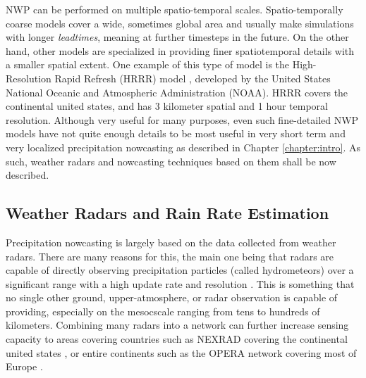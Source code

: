NWP can be performed on multiple spatio-temporal scales. Spatio-temporally coarse models cover a wide, sometimes global area and usually make simulations with longer \textit{leadtimes}, meaning at further timesteps in the future. On the other hand, other models are specialized in providing finer spatiotemporal details with a smaller spatial extent. One example of this type of model is the High-Resolution Rapid Refresh (HRRR) model \cite{alexander2020rapid}, developed by the United States National Oceanic and Atmospheric Administration (NOAA). HRRR covers the continental united states, and has 3 kilometer spatial and 1 hour temporal resolution. Although very useful for many purposes, even such fine-detailed NWP models have not quite enough details to be most useful in very short term and very localized precipitation nowcasting \cite{radhakrishnan2020casa} as described in Chapter \ref{chapter:intro}. As such, weather radars and nowcasting techniques based on them shall be now described.

\subsection*{Weather Radars and Rain Rate Estimation}

	

Precipitation nowcasting is largely based on the data collected from weather radars. 
There are many reasons for this, the main one being that radars are capable of directly observing precipitation particles (called hydrometeors) over a significant range with a high update rate and resolution \cite{schmid2019nowcasting}. This is something that no single other ground, upper-atmosphere, or radar observation is capable of providing, especially on the mesocscale ranging from tens to hundreds of kilometers. Combining many radars into a network can further increase sensing capacity to areas covering countries such as NEXRAD covering the continental united states \cite{noauthor_next_2020}, or entire continents such as the OPERA network covering most of Europe \cite{saltikoff_opera_2019}. 


